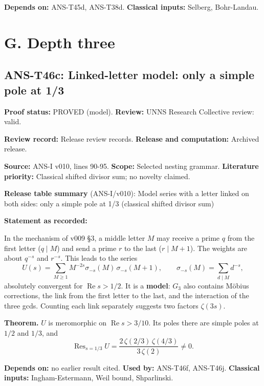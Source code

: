 \documentclass[
  11pt,
]{article}
\begin{document}
\textbf{Depends on:} ANS-T45d, ANS-T38d. \textbf{Classical inputs:}
Selberg, Bohr-Landau.

\hypertarget{g.-depth-three}{%
\section{G. Depth three}\label{g.-depth-three}}

\hypertarget{ans-t46c-linked-letter-model-only-a-simple-pole-at-13}{%
\subsection{ANS-T46c: Linked-letter model: only a simple pole at
1/3}\label{ans-t46c-linked-letter-model-only-a-simple-pole-at-13}}

\textbf{Proof status:} PROVED (model). \textbf{Review:} UNNS Research
Collective review: valid.

\textbf{Review record:} Release review records. \textbf{Release and
computation:} Archived release.

\textbf{Source:} ANS-I v010, lines 90-95. \textbf{Scope:} Selected
nesting grammar. \textbf{Literature priority:} Classical shifted divisor
sum; no novelty claimed.

\textbf{Release table summary} (ANS-I/v010): Model series with a letter
linked on both sides: only a simple pole at 1/3 (classical shifted
divisor sum)

\textbf{Statement as recorded:}

In the mechanism of v009 §3, a middle letter \(M\) may receive a prime
\(q\) from the first letter (\(q\mid M\)) and send a prime \(r\) to the
last (\(r\mid M+1\)). The weights are about \(q^{-s}\) and \(r^{-s}\).
This leads to the series
\[U(s)=\sum_{M\ge1}M^{-2s}\sigma_{-s}(M)\,\sigma_{-s}(M+1),\qquad\sigma_{-s}(M)=\sum_{d\mid M}d^{-s},\]
absolutely convergent for \(\operatorname{Re}s>1/2\). It is a
\textbf{model}: \(G_3\) also contains Möbius corrections, the link from
the first letter to the last, and the interaction of the three gcds.
Counting each link separately suggests two factors \(\zeta(3s)\).

\textbf{Theorem.} \(U\) is meromorphic on \(\operatorname{Re}s>3/10\).
Its poles there are simple poles at \(1/2\) and \(1/3\), and
\[\operatorname{Res}_{s=1/3}U=\frac{2\,\zeta(2/3)\,\zeta(4/3)}{3\,\zeta(2)}\ne0.\]

\textbf{Depends on:} no earlier result cited. \textbf{Used by:}
ANS-T46f, ANS-T46j. \textbf{Classical inputs:} Ingham-Estermann, Weil
bound, Shparlinski.
\end{document}
